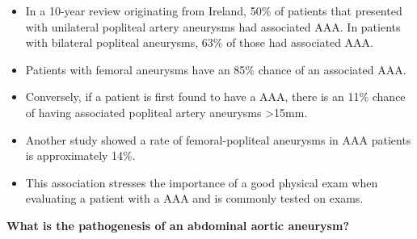 \documentclass[
]{book}
\begin{document}
\begin{itemize}
  \begin{itemize}
  \item
    In a 10-year review originating from Ireland, 50\% of patients
    that presented with unilateral popliteal artery aneurysms had
    associated AAA. In patients with bilateral popliteal aneurysms,
    63\% of those had associated AAA.
    \citep{duffyPoplitealAneurysms10year1998}
  \item
    Patients with femoral aneurysms have an 85\% chance of an
    associated AAA. \citep{diwanIncidenceFemoralPopliteal2000}
  \item
    Conversely, if a patient is first found to have a AAA, there is
    an 11\% chance of having associated popliteal artery aneurysms
    \textgreater15mm. \citep{tuvesonPatientsAbdominalAortic2016}
  \item
    Another study showed a rate of femoral-popliteal aneurysms in
    AAA patients is approximately 14\%.
    \citep{diwanIncidenceFemoralPopliteal2000}
  \item
    This association stresses the importance of a good physical exam
    when evaluating a patient with a AAA and is commonly tested on
    exams.\citep{chaikof2018, diwan2000}
  \end{itemize}
\end{itemize}

\textbf{What is the pathogenesis of an abdominal aortic aneurysm?}
\citep{mooreVascularEndovascularSurgery2019}
\end{document}
